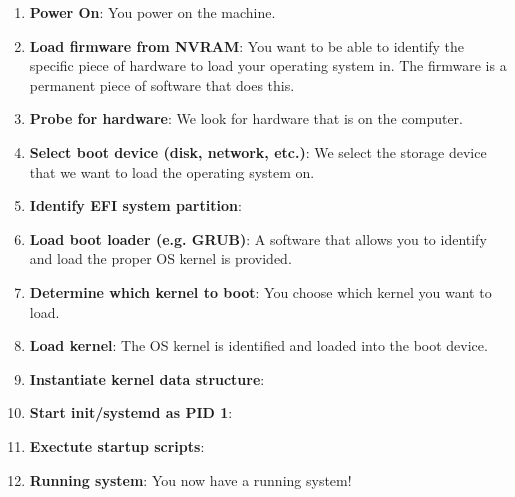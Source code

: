 \documentclass{article}
\begin{document}
    \begin{enumerate}
      \item \textbf{Power On}: You power on the machine. 
      \item \textbf{Load firmware from NVRAM}: You want to be able to identify the specific piece of hardware to load your operating system in. The firmware is a permanent piece of software that does this. 
      \item \textbf{Probe for hardware}: We look for hardware that is on the computer. 
      \item \textbf{Select boot device (disk, network, etc.)}: We select the storage device that we want to load the operating system on. 
      \item \textbf{Identify EFI system partition}: 
      \item \textbf{Load boot loader (e.g. GRUB)}: A software that allows you to identify and load the proper OS kernel is provided. 
      \item \textbf{Determine which kernel to boot}: You choose which kernel you want to load.  
      \item \textbf{Load kernel}: The OS kernel is identified and loaded into the boot device. 
      \item \textbf{Instantiate kernel data structure}: 
      \item \textbf{Start init/systemd as PID 1}: 
      \item \textbf{Exectute startup scripts}:
      \item \textbf{Running system}: You now have a running system! 
    \end{enumerate}
\end{document}
